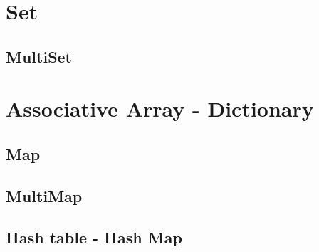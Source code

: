 
\chapter{Set}
\section{MultiSet}

\chapter{Associative Array - Dictionary}
\section{Map}
\section{MultiMap}
\section{Hash table - Hash Map}
\iffalse
http://www.tommyds.it/doc/benchmark.html
\fi
